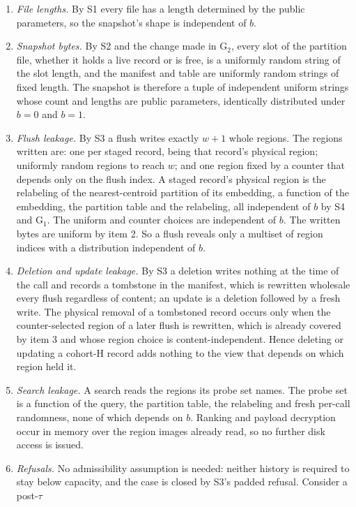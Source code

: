\begin{enumerate}
\item \emph{File lengths.} By S1 every file has a length determined by the public parameters, so
the snapshot's shape is independent of $b$.
\item \emph{Snapshot bytes.} By S2 and the change made in $\mathrm{G}_2$, every slot of the
partition file, whether it holds a live record or is free, is a uniformly random string of the
slot length, and the manifest and table are uniformly random strings of fixed length. The snapshot
is therefore a tuple of independent uniform strings whose count and lengths are public parameters,
identically distributed under $b=0$ and $b=1$.
\item \emph{Flush leakage.} By S3 a flush writes exactly $w+1$ whole regions. The regions written
are: one per staged record, being that record's physical region; uniformly random regions to reach
$w$; and one region fixed by a counter that depends only on the flush index. A staged record's
physical region is the relabeling of the nearest-centroid partition of its embedding, a function of
the embedding, the partition table and the relabeling, all independent of $b$ by S4 and
$\mathrm{G}_1$. The uniform and counter choices are independent of $b$. The written bytes are
uniform by item 2. So a flush reveals only a multiset of region indices with a distribution
independent of $b$.
\item \emph{Deletion and update leakage.} By S3 a deletion writes nothing at the time of the call
and records a tombstone in the manifest, which is rewritten wholesale every flush regardless of
content; an update is a deletion followed by a fresh write. The physical removal of a tombstoned
record occurs only when the counter-selected region of a later flush is rewritten, which is already
covered by item 3 and whose region choice is content-independent. Hence deleting or updating a
cohort-H record adds nothing to the view that depends on which region held it.
\item \emph{Search leakage.} A search reads the regions its probe set names. The probe set is a
function of the query, the partition table, the relabeling and fresh per-call randomness, none of
which depends on $b$. Ranking and payload decryption occur in memory over the region images already
read, so no further disk access is issued.
\item \emph{Refusals.} No admissibility assumption is needed: neither history is required to stay
below capacity, and the case is closed by S3's padded refusal. Consider a post-$\tau$

\end{enumerate}

